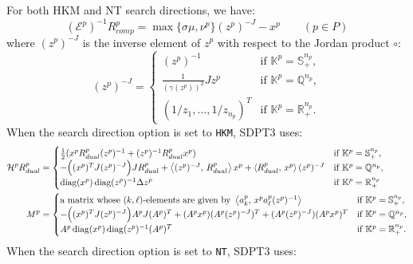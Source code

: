For both HKM and NT search directions, we have:
\begin{equation}
    (\mathcal{E}^p)^{-1}R^p_{comp} = \max\{\sigma\mu, \nu^p\}(z^p)^{-J} - x^p \qquad (p \in P)
    \label{eq:Einv_Rcomp}
\end{equation}
where $(z^p)^{-J}$ is the inverse element of $z^p$ with respect to the Jordan product $\circ$:
\[
    (z^p)^{-J} = \begin{cases}
        (z^p)^{-1} & \text{if } \mathbb{K}^p = \mathbb{S}^{n_p}_+, \\
        \frac{1}{(\gamma(z^p))^2} J z^p & \text{if } \mathbb{K}^p = \mathbb{Q}^{n_p}, \\
        (1/z_1, \ldots, 1/z_{n_p})^T & \text{if } \mathbb{K}^p = \mathbb{R}^{n_p}_+.
    \end{cases}
\]
\medskip
When the search direction option is set to \texttt{HKM}, SDPT3 uses:
\begin{align}
    \mathcal{H}^p R^p_{dual} &= \begin{cases}
        \frac{1}{2}(x^p R^p_{dual} (z^p)^{-1} + (z^p)^{-1} R^p_{dual} x^p) & \text{if } \mathbb{K}^p = \mathbb{S}^{n_p}_+,\\
        - \Big( (x^p)^T J (z^p)^{-J} \Big) J R^p_{dual} + \left\langle (z^p)^{-J}, \, R^p_{dual} \right\rangle x^p + \left\langle R^p_{dual}, \, x^p \right\rangle (z^p)^{-J} & \text{if } \mathbb{K}^p = \mathbb{Q}^{n_p},\\
        \operatorname{diag}(x^p) \operatorname{diag}(z^p)^{-1} \Delta z^p & \text{if } \mathbb{K}^p = \mathbb{R}^{n_p}_+
    \end{cases} \label{eq:HKM_HRd}\\
    M^p &= \begin{cases} 
        \text{a matrix whose $(k,\ell)$-elements are given by } \left\langle a^p_k, \, x^p a^p_\ell (z^p)^{-1} \right\rangle & \text{if } \mathbb{K}^p = \mathbb{S}^{n_p}_+, \\
        -\Big( (x^p)^T J (z^p)^{-J} \Big) A^p J (A^p)^T + (A^p x^p)(A^p (z^p)^{-J})^T + (A^p (z^p)^{-J})(A^p x^p)^T& \text{if } \mathbb{K}^p = \mathbb{Q}^{n_p}, \\
        A^p \operatorname{diag}(x^p) \operatorname{diag}(z^p)^{-1} (A^p)^T & \text{if } \mathbb{K}^p = \mathbb{R}^{n_p}_+.
    \end{cases}
\end{align}
\medskip
When the search direction option is set to \texttt{NT}, SDPT3 uses:
